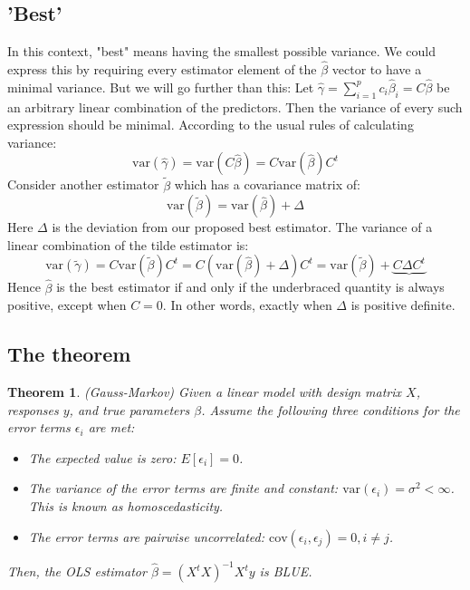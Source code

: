 \documentclass[12pt, a4paper]{article}
\newtheorem{theorem}{Theorem}
\begin{document}
\subsection{'Best'}
In this context, "best" means having the smallest possible variance. We could express this by requiring every estimator element of the $\hat{\beta}$ vector to have a minimal variance. But we will go further than this: Let $\hat{\gamma}=\sum_{i=1}^p c_i\hat{\beta}_i=C\hat{\beta}$ be an arbitrary linear combination of the predictors. Then the variance of every such expression should be minimal. According to the usual rules of calculating variance:
\begin{equation}
\textrm{var}(\hat{\gamma})=\textrm{var}(C\hat{\beta})=C\textrm{var}(\hat{\beta})C^t
\end{equation}
Consider another estimator $\tilde{\beta}$ which has a covariance matrix of:
\begin{equation}
\textrm{var}(\tilde{\beta})=\textrm{var}(\hat{\beta})+\Delta
\end{equation}
Here $\Delta$ is the deviation from our proposed best estimator. The variance of a linear combination of the tilde estimator is:
\begin{equation}
\textrm{var}(\tilde{\gamma})=C\textrm{var}(\tilde{\beta})C^t=C(\textrm{var}(\hat{\beta})+\Delta)C^t=\textrm{var}(\tilde{\beta})+\underbrace{C\Delta C^t}
\end{equation}
Hence $\hat{\beta}$ is the best estimator if and only if the underbraced quantity is always positive, except when $C=0$. In other words, exactly when $\Delta$ is positive definite.

\subsection{The theorem}

\begin{theorem}
(Gauss-Markov) Given a linear model with design matrix $X$, responses $y$, and true parameters $\beta$. Assume the following three conditions for the error terms $\epsilon_i$ are met:
\begin{itemize}
\item The expected value is zero: $E[\epsilon_i]=0$.
\item The variance of the error terms are finite and constant: $\textrm{var}(\epsilon_i)=\sigma^2<\infty$. This is known as homoscedasticity.
\item The error terms are pairwise uncorrelated: $\textrm{cov}(\epsilon_i,\epsilon_j)=0, i\neq j$.
\end{itemize}
Then, the OLS estimator $\hat{\beta}=(X^t X)^{-1}X^t y$ is BLUE.
\end{theorem}
\end{document}
